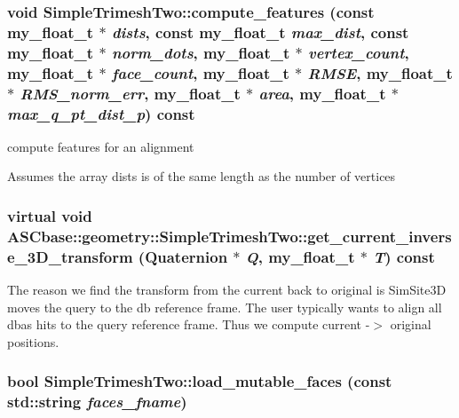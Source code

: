 \subsubsection{\setlength{\rightskip}{0pt plus 5cm}void Simple\-Trimesh\-Two::compute\_\-features (const my\_\-float\_\-t $\ast$ {\em dists}, const my\_\-float\_\-t {\em max\_\-dist}, const my\_\-float\_\-t $\ast$ {\em norm\_\-dots}, my\_\-float\_\-t $\ast$ {\em vertex\_\-count}, my\_\-float\_\-t $\ast$ {\em face\_\-count}, my\_\-float\_\-t $\ast$ {\em RMSE}, my\_\-float\_\-t $\ast$ {\em RMS\_\-norm\_\-err}, my\_\-float\_\-t $\ast$ {\em area}, my\_\-float\_\-t $\ast$ {\em max\_\-q\_\-pt\_\-dist\_\-p}) const}\label{classASCbase_1_1geometry_1_1SimpleTrimeshTwo_dc04eadf0d6585ebd118e6b3fd76402e}


compute features for an alignment 

Assumes the array dists is of the same length as the number of vertices 
\subsubsection{\setlength{\rightskip}{0pt plus 5cm}virtual void ASCbase::geometry::Simple\-Trimesh\-Two::get\_\-current\_\-inverse\_\-3D\_\-transform (Quaternion $\ast$ {\em Q}, my\_\-float\_\-t $\ast$ {\em T}) const\hspace{0.3cm}{\tt  [inline, virtual]}}\label{classASCbase_1_1geometry_1_1SimpleTrimeshTwo_3fcbc1c1ac5c6e9443bfcf6c98a8c7c4}


The reason we find the transform from the current back to original is Sim\-Site3D moves the query to the db reference frame. The user typically wants to align all dbas hits to the query reference frame. Thus we compute current -$>$ original positions. 
\subsubsection{\setlength{\rightskip}{0pt plus 5cm}bool Simple\-Trimesh\-Two::load\_\-mutable\_\-faces (const std::string {\em faces\_\-fname})\hspace{0.3cm}{\tt  [private]}}\label{classASCbase_1_1geometry_1_1SimpleTrimeshTwo_95efedbd9a7a3bb583b5e604eeed7015}


